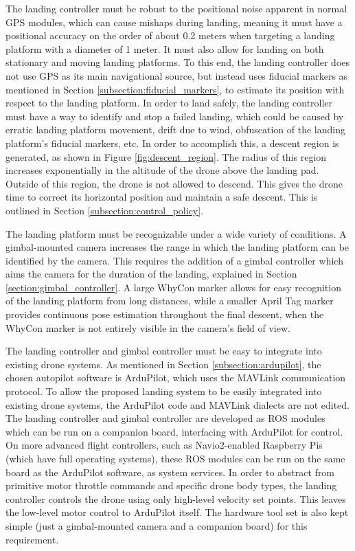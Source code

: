 \label{section:requirements}
The landing controller must be robust to the positional noise apparent in normal GPS modules, which can cause mishaps during landing, meaning it must have a positional accuracy on the order of about 0.2 meters when targeting a landing platform with a diameter of 1 meter. It must also allow for landing on both stationary and moving landing platforms. To this end, the landing controller does not use GPS as its main navigational source, but instead uses fiducial markers as mentioned in Section \ref{subsection:fiducial_markers}, to estimate its position with respect to the landing platform. In order to land safely, the landing controller must have a way to identify and stop a failed landing, which could be caused by erratic landing platform movement, drift due to wind, obfuscation of the landing platform's fiducial markers, etc. In order to accomplish this, a descent region is generated, as shown in Figure \ref{fig:descent_region}. The radius of this region increases exponentially in the altitude of the drone above the landing pad. Outside of this region, the drone is not allowed to descend. This gives the drone time to correct its horizontal position and maintain a safe descent. This is outlined in Section \ref{subsection:control_policy}.

The landing platform must be recognizable under a wide variety of conditions. A gimbal-mounted camera increases the range in which the landing platform can be identified by the camera. This requires the addition of a gimbal controller which aims the camera for the duration of the landing, explained in Section \ref{section:gimbal_controller}. A large WhyCon marker allows for easy recognition of the landing platform from long distances, while a smaller April Tag marker provides continuous pose estimation throughout the final descent, when the WhyCon marker is not entirely visible in the camera's field of view.

The landing controller and gimbal controller must be easy to integrate into existing drone systems. As mentioned in Section \ref{subsection:ardupilot}, the chosen autopilot software is ArduPilot, which uses the MAVLink communication protocol. To allow the proposed landing system to be easily integrated into existing drone systems, the ArduPilot code and MAVLink dialects are not edited. The landing controller and gimbal controller are developed as ROS modules which can be run on a companion board, interfacing with ArduPilot for control. On more advanced flight controllers, such as Navio2-enabled Raspberry Pis (which have full operating systems), these ROS modules can be run on the same board as the ArduPilot software, as system services. In order to abstract from primitive motor throttle commands and specific drone body types, the landing controller controls the drone using only high-level velocity set points. This leaves the low-level motor control to ArduPilot itself. The hardware tool set is also kept simple (just a gimbal-mounted camera and a companion board) for this requirement.